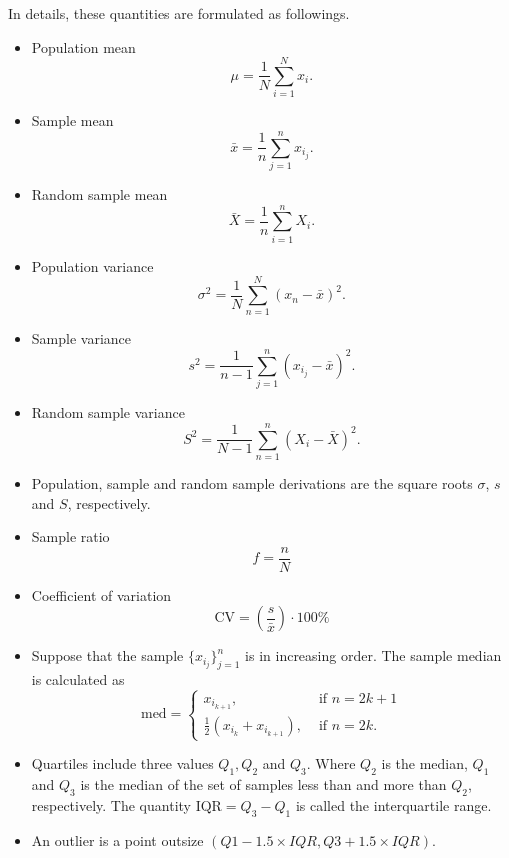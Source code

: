 In details, these quantities are formulated as followings.
\begin{itemize}
 \item Population mean
       \begin{equation}
        \mu = \frac{1}{N} \sum_{i=1}^N x_i.
       \end{equation}
 \item Sample mean
       \begin{equation}
        \bar{x} = \frac{1}{n} \sum_{j=1}^n x_{i_j}.
       \end{equation}
 \item Random sample mean
       \begin{equation}
        \bar{X} = \frac{1}{n} \sum_{i=1}^n X_i.
       \end{equation}
 \item Population variance
       \begin{equation}
        \sigma^2 = \dfrac{1}{N} \sum_{n=1}^N (x_n - \bar{x})^2.
       \end{equation}
 \item Sample variance
       \begin{equation}
        s^2 = \dfrac{1}{n-1} \sum_{j=1}^n (x_{i_j} - \bar{x})^2.
       \end{equation}
 \item Random sample variance
       \begin{equation}
        S^2 = \dfrac{1}{N-1} \sum_{n=1}^n (X_i - \bar{X})^2.
       \end{equation}
 \item Population, sample and random sample derivations are the square roots $\sigma$, $s$ and $S$, respectively.

 \item Sample ratio
       \begin{equation}
        f = \dfrac{n}{N}
       \end{equation}
 \item Coefficient of variation
       \begin{equation}
        \mathrm{CV} = \left(\frac{s}{\bar{x}}\right) \cdot 100\%
       \end{equation}
 \item Suppose that the sample $\{x_{i_j}\}_{j=1}^n$ is in increasing order. The sample median is calculated as
       \begin{equation}
        \mathrm{med} = \begin{cases}
         x_{i_{k+1}},                           & \text{ if } n = 2k+1 \\
         \frac{1}{2} (x_{i_{k}} + x_{i_{k+1}}), & \text{ if } n = 2k.
        \end{cases}
       \end{equation}
 \item Quartiles include three values $Q_1,Q_2$ and $Q_3$. Where $Q_2$ is the median, $Q_1$ and $Q_3$ is the median of the set of samples less than and more than $Q_2$, respectively. The quantity $\mathrm{IQR} = Q_3-Q_1$ is called the interquartile range.
 \item An outlier is a point outsize $(Q1 - 1.5 \times IQR, Q3 + 1.5 \times IQR)$.
\end{itemize}

